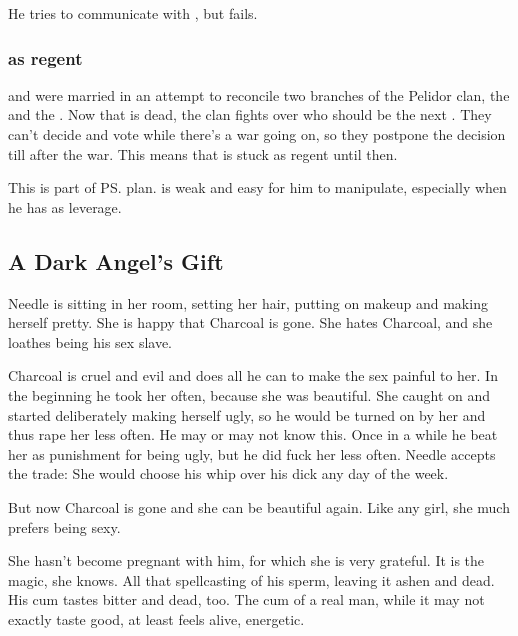 He tries to communicate with \Tiroco, but fails.





\subsubsection{\Tiroco{} as regent}
\Tiroco{} and \Icor{} were married in an attempt to reconcile two branches of the Pelidor clan, the \Malcurians{} and the \Forcliners. 
Now that \Icor{} is dead, the clan fights over who should be the next \rayuth. 
They can't decide and vote while there's a war going on, so they postpone the decision till after the war. 
This means that \Tiroco{} is stuck as regent until then. 

This is part of \ps{\Psyrex}{} plan. 
\Tiroco{} is weak and easy for him to manipulate, especially when he has \Icor{} as leverage. 







\subsection{A Dark Angel's Gift}
Needle is sitting in her room, setting her hair, putting on makeup and making herself pretty. She is happy that Charcoal is gone. She hates Charcoal, and she loathes being his sex slave. 

Charcoal is cruel and evil and does all he can to make the sex painful to her. In the beginning he took her often, because she was beautiful. She caught on and started deliberately making herself ugly, so he would be turned on by her and thus rape her less often. He may or may not know this. Once in a while he beat her as punishment for being ugly, but he did fuck her less often. Needle accepts the trade: She would choose his whip over his dick any day of the week. 

But now Charcoal is gone and she can be beautiful again. Like any girl, she much prefers being sexy. 

She hasn't become pregnant with him, for which she is very grateful. It is the magic, she knows. All that spellcasting  of his sperm, leaving it ashen and dead. His cum tastes bitter and dead, too. The cum of a real man, while it may not exactly taste good, at least feels alive, energetic. 





